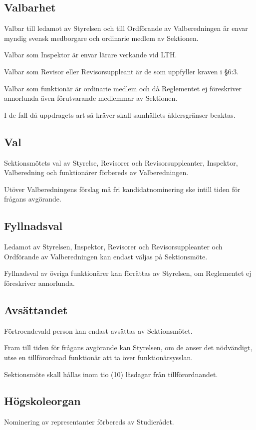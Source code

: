 \documentclass[10pt]{article}
\begin{document}
\subsection{Valbarhet}
Valbar till ledamot av Styrelsen och till Ordförande av Valberedningen är envar myndig svensk medborgare och ordinarie medlem av Sektionen.

Valbar som Inspektor är envar lärare verkande vid LTH.

Valbar som Revisor eller Revisorsuppleant är de som uppfyller kraven i §6:3.

Valbar som funktionär är ordinarie medlem och då Reglementet ej föreskriver
annorlunda även förutvarande medlemmar av Sektionen.

I de fall då uppdragets art så kräver skall samhällets åldersgränser beaktas.

\subsection{Val}
Sektionsmötets val av Styrelse, Revisorer och
Revisorsuppleanter, Inspektor, Valberedning och funktionärer förbereds av
Valberedningen.

Utöver Valberedningens förslag må fri kandidatnominering ske intill tiden
för frågans avgörande.

\subsection{Fyllnadsval}
Ledamot av Styrelsen, Inspektor, Revisorer och Revisorsuppleanter och
Ordförande av Valberedningen kan endast väljas på
Sektionsmöte.

Fyllnadsval av övriga funktionärer kan förrättas av Styrelsen, om
Reglementet ej föreskriver annorlunda.

\subsection{Avsättandet}
Förtroendevald person kan endast avsättas av Sektionsmötet.

Fram till tiden för frågans avgörande kan Styrelsen, om de anser det
nödvändigt, utse en tillförordnad funktionär att ta över funktionärsysslan.

Sektionsmöte skall hållas inom tio (10) läsdagar från tillförordnandet.

\subsection{Högskoleorgan}
Nominering av representanter förbereds av Studierådet.
\end{document}
